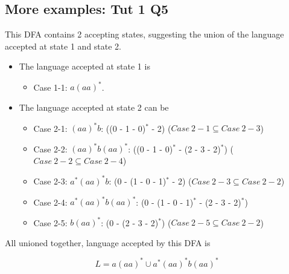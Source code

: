 \documentclass[12pt]{article}
\begin{document}
\subsection*{More examples: Tut 1 Q5}
\begin{center}
\end{center}
This DFA contains 2 accepting states, suggesting the union of the language accepted at state 1 and state 2.
\begin{itemize}
    \item The language accepted at state 1 is 
    \begin{itemize}
        \item Case 1-1: \(a(aa)^*\).
    \end{itemize}
    \item The language accepted at state 2 can be 
    \begin{itemize}
        \item  Case 2-1: \((aa)^*b\): ((0 - 1 - 0)\(^*\) - 2) (\(Case\ 2-1 \subseteq Case\ 2-3\))
        \item  Case 2-2: \((aa)^*b(aa)^*\):  ((0 - 1 - 0)\(^*\) - (2 - 3 - 2)\(^*\)) (\(Case\ 2-2 \subseteq Case\ 2-4\))
        \item  Case 2-3: \(a^*(aa)^*b\):  (0 - (1 - 0 - 1)\(^*\) - 2) (\(Case\ 2-3 \subseteq Case\ 2-2\))
        \item  Case 2-4: \(a^*(aa)^*b(aa)^*\):  (0 - (1 - 0 - 1)\(^*\) - (2 - 3 - 2)\(^*\))
        \item  Case 2-5: \(b(aa)^*\): (0 - (2 - 3 - 2)\(^*\)) (\(Case\ 2-5 \subseteq Case\ 2-2\))
    \end{itemize}
\end{itemize}
All unioned together, language accepted by this DFA is 
    \begin{center}
        \[L = a(aa)^* \cup a^*(aa)^*b(aa)^*\]
    \end{center}
\end{document}
